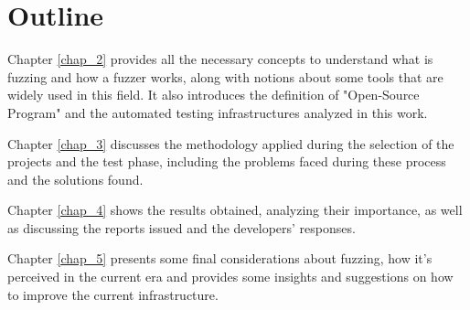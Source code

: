 \section{Outline}


Chapter \ref{chap_2} provides all the necessary concepts to understand what is fuzzing and how a fuzzer works, along with notions about some tools that are widely used in this field. It also introduces the definition of "Open-Source Program" and the automated testing infrastructures analyzed in this work.

Chapter \ref{chap_3} discusses the methodology applied during the selection of the projects and the test phase, including the problems faced during these process and the solutions found.

Chapter \ref{chap_4} shows the results obtained, analyzing their importance, as well as discussing the reports issued and the developers' responses.

Chapter \ref{chap_5} presents some final considerations about fuzzing, how it's perceived in the current era and provides some insights and suggestions on how to improve the current infrastructure.
